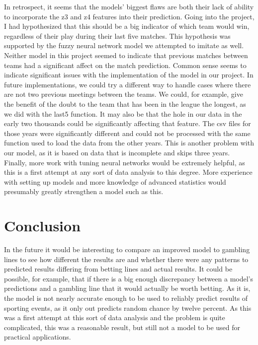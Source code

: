 \documentclass{article}
\begin{document}
In retrospect, it seems that the models' biggest flaws are both their lack of ability to incorporate the z3 and z4 features into their prediction. Going into the project, I had hypothesized that this should be a big indicator of which team would win, regardless of their play during their last five matches. This hypothesis was supported by the fuzzy neural network model we attempted to imitate as well. Neither model in this project seemed to indicate that previous matches between teams had a significant affect on the match prediction. Common sense seems to indicate significant issues with the implementation of the model in our project. In future implementations, we could try a different way to handle cases where there are not two previous meetings between the teams. We could, for example, give the benefit of the doubt to the team that has been in the league the longest, as we did with the last5 function. It may also be that the hole in our data in the early two thousands could be significantly affecting that feature. The csv files for those years were significantly different and could not be processed with the same function used to load the data from the other years. This is another problem with our model, as it is based on data that is incomplete and skips three years. Finally, more work with tuning neural networks would be extremely helpful, as this is a first attempt at any sort of data analysis to this degree. More experience with setting up models and more knowledge of advanced statistics would presumably greatly strengthen a model such as this.

\section{Conclusion}
In the future it would be interesting to compare an improved model to gambling lines to see how different the results are and whether there were any patterns to predicted results differing from betting lines and actual results. It could be possible, for example, that if there is a big enough discrepancy between a model's predictions and a gambling line that it would actually be worth betting. As it is, the model is not nearly accurate enough to be used to reliably predict results of sporting events, as it only out predicts random chance by twelve percent. As this was a first attempt at this sort of data analysis and the problem is quite complicated, this was a reasonable result, but still not a model to be used for practical applications.



\end{document}
